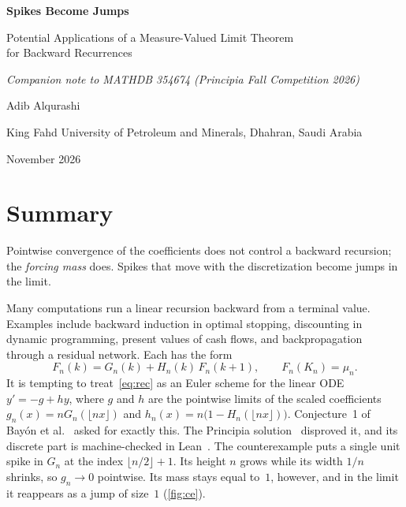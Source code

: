 \documentclass[11pt]{article}
\theoremstyle{plain}
\theoremstyle{remark}
\begin{document}
\thispagestyle{plain}
\begin{center}
  {\LARGE\bfseries Spikes Become Jumps\par}
  \vspace{4pt}
  {\large Potential Applications of a Measure-Valued Limit Theorem\\ for Backward Recurrences\par}
  \vspace{8pt}
  {\normalsize\itshape Companion note to MATHDB 354674 (Principia Fall Competition 2026)\par}
  \vspace{10pt}
  {\normalsize Adib Alqurashi\par}
  {\small King Fahd University of Petroleum and Minerals, Dhahran, Saudi Arabia\par}
  \vspace{2pt}
  {\small November 2026\par}
\end{center}
\vspace{4pt}

\section{Summary}

\begin{keybox}
Pointwise convergence of the coefficients does not control a backward recursion; the
\emph{forcing mass} does. Spikes that move with the discretization become jumps in the limit.
\end{keybox}

\noindent
Many computations run a linear recursion backward from a terminal value. Examples include
backward induction in optimal stopping, discounting in dynamic programming, present values
of cash flows, and backpropagation through a residual network. Each has the form
\begin{equation}\label{eq:rec}
  F_n(k) = G_n(k) + H_n(k)\,F_n(k+1), \qquad F_n(K_n)=\mu_n .
\end{equation}
It is tempting to treat~\eqref{eq:rec} as an Euler scheme for the linear ODE
$y'=-g+hy$, where $g$ and $h$ are the pointwise limits of the scaled coefficients
$g_n(x)=nG_n(\lfloor nx\rfloor)$ and $h_n(x)=n\bigl(1-H_n(\lfloor nx\rfloor)\bigr)$.
Conjecture~1 of Bay\'on et al.~\cite{bayon} asked for exactly this. The Principia
solution~\cite{principia} disproved it, and its discrete part is machine-checked in
Lean~\cite{lean}. The counterexample puts a single unit spike in $G_n$ at the index
$\lfloor n/2\rfloor+1$. Its height $n$ grows while its width $1/n$ shrinks, so $g_n\to 0$
pointwise. Its mass stays equal to~$1$, however, and in the limit it reappears as a jump
of size~$1$ (\cref{fig:ce}).
\end{document}
